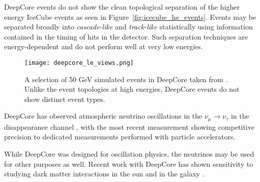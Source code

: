 DeepCore events do not show the clean topological separation of the higher energy IceCube events as seen in Figure~\ref{fig:icecube_he_events}.
Events may be separated broadly into \emph{cascade-like} and \emph{track-like} statistically using information contained in the timing of hits in the detector.
Such separation techniques are energy-dependent and do not perform well at very low energies.

\begin{figure}
\texttt{[image: deepcore\_le\_views.png]} 
\caption{A selection of 50 GeV simulated events in DeepCore taken from \cite{Thesis-Euler}. Unlike the event topologies at high energies, DeepCore events do not show distinct event types.}
\label{fig:deepcore_events}
\end{figure}

DeepCore has observed atmospheric neutrino oscillations in the $\nu_\mu \rightarrow \nu_\tau$ in the disappearance channel \cite{IceCube-Oscillation2013,IceCube-Oscillation2015,IceCube-Oscillation2018}, with the most recent measurement showing competitive precision to dedicated measurements performed with particle accelerators.

While DeepCore was designed for oscillation physics, the neutrinos may be used for other purposes as well. 
Recent work with DeepCore has shown sensitivity to studying dark matter interactions in the sun \cite{IceCube-LE-SolarDarkMatter} and in the galaxy \cite{IceCube-LE-GalacticDarkMatter}.


